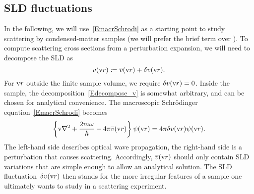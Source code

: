 \subsection{SLD fluctuations}\label{Sfluct}

In the following, we will use~\cref{EmacrSchrodi}
as a starting point to study scattering by condensed-matter samples
(we will prefer the brief term  over ).
%
%
To compute scattering cross sections from a perturbation expansion,
%
we will need to decompose the SLD as
\begin{equation}\label{Edecompose_v}
  v(\text{v}{r}) \coloneqq \overline{v}(\text{v}{r}) + \delta v(\text{v}{r}).
\end{equation}
%
%
For $\text{v}{r}$ outside the finite sample volume, we require $\delta v(\text{v}{r})=0$.
Inside the sample, the decomposition~\cref{Edecompose_v} is somewhat arbitrary,
and can be chosen for analytical convenience.
The macroscopic Schrödinger equation~\cref{EmacrSchrodi} becomes
\begin{equation}\label{ESchrodi3}
  \left\{ \text{v}{\nabla}^2 + \frac{2m\omega}{\hbar} - 4\pi\overline{v}(\text{v}{r}) \right\}\psi(\text{v}{r})
  = 4\pi\delta v(\text{v}{r})\psi(\text{v}{r}).
\end{equation}
The left-hand side describes optical wave propagation,
the right-hand side is a perturbation that causes scattering.
%
%
%
Accordingly, $\overline{v}(\text{v}{r})$ should only contain SLD variations
that are simple enough to allow an analytical solution.
The SLD fluctuation~$\delta v(\text{v}{r})$ then stands for the more irregular
features of a sample one ultimately wants to study in a scattering experiment.

